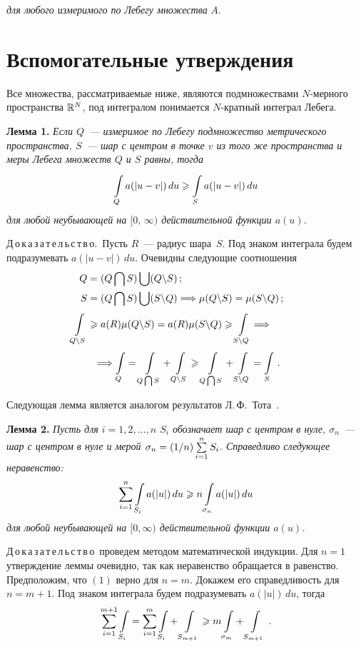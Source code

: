 \begin{multicols}{2}
\noindent
{\it для любого измеримого по Лебегу множества} $A$.

\section{Вспомогательные утверждения}

Все множества, рассматриваемые ниже, являются подмножествами $N$-мерного пространства ${\mathbb{R}}^N$,
под интегралом понимается $N$-кратный интеграл Лебега.

\smallskip

\noindent
\textbf{Лемма 1.} \textit{Если $Q$~--- измеримое по Лебегу подмножество метрического пространства,
$S$~--- шар с центром в точке $v$ из того же пространства и меры Лебега множеств $Q$ и $S$ равны,
тогда}
$$
\int\limits_{Q}^{} a(|u-v|)\,du \geqslant \int\limits_{S}^{} a(|u-v|)\,du
$$
\textit{для любой неубывающей на $[0,\,\infty)$ действительной функции $a(u)$.}
\smallskip

\noindent
Д\,о\,к\,а\,з\,а\,т\,е\,л\,ь\,с\,т\,в\,о.~Пусть $R$~--- радиус шара~$S$. Под знаком интеграла будем
подразумевать $a(|u-v|)\,du$. Очевидны следующие соотношения
\begin{align*}
Q&=(Q\bigcap S)\bigcup (Q\backslash S)\,;\\
S&=(Q\bigcap S)\bigcup (S\backslash Q)
\Longrightarrow \mu(Q\backslash S)=\mu(S\backslash Q) \,;\\
\il{Q\backslash S}{} &\geqslant a(R) \mu(Q\backslash S) = a(R) \mu(S\backslash Q) \geqslant
\il{S\backslash Q}{}  \Longrightarrow\\
&\ \ \Longrightarrow
\il{Q}{}=\il{Q \bigcap S}{} + \il{Q\backslash S}{} \geqslant
\il{Q \bigcap S}{} +
\il{S\backslash Q}{} =
\il{S}{}\,. \qquad  %
\end{align*}
\smallskip

Следующая лемма является аналогом результатов Л.\,Ф.~Тота~\cite{4za}.

\smallskip

\noindent
\textbf{Лемма 2.} \textit{Пусть для $i=1,2,\ldots,n$ $S_i$ обозначает шар с центром в нуле,
$\sigma_n$~--- шар с центром в нуле и мерой $\sigma_n=(1/n) \sum\limits_{i=1}^n S_i$. Справедливо
следующее неравенство:}
\begin{equation}
\sum\limits_{i=1}^n \int\limits_{S_i}^{} a(|u|)\,du \geqslant n \int\limits_{\sigma_n}^{} a(|u|)\,du
\label{e1z}
\end{equation}
\textit{для любой неубывающей на $[0,\infty)$ действительной функции $a(u)$.}
\smallskip

\noindent
Д\,о\,к\,а\,з\,а\,т\,е\,л\,ь\,с\,т\,в\,о~проведем методом математической индукции. Для $n=1$ утверждение
леммы очевидно, так как неравенство обращается в равенство. Предположим, что $(1)$ верно для
$n=m$. Докажем его справедливость для $n=m+1$. Под знаком интеграла будем подразумевать
$a(|u|)\,du$, тогда
\begin{equation}
\sum\limits_{i=1}^{m+1}\int\limits_{S_i}^{} = \sum\limits_{i=1}^{m} \int\limits_{S_i}^{} + \int\limits_{S_{m+1}}^{} \geqslant m
\int\limits_{\sigma_m}^{} + \int\limits_{S_{m+1}}^{} \,.
\label{e2z}
\end{equation}


\end{multicols}
